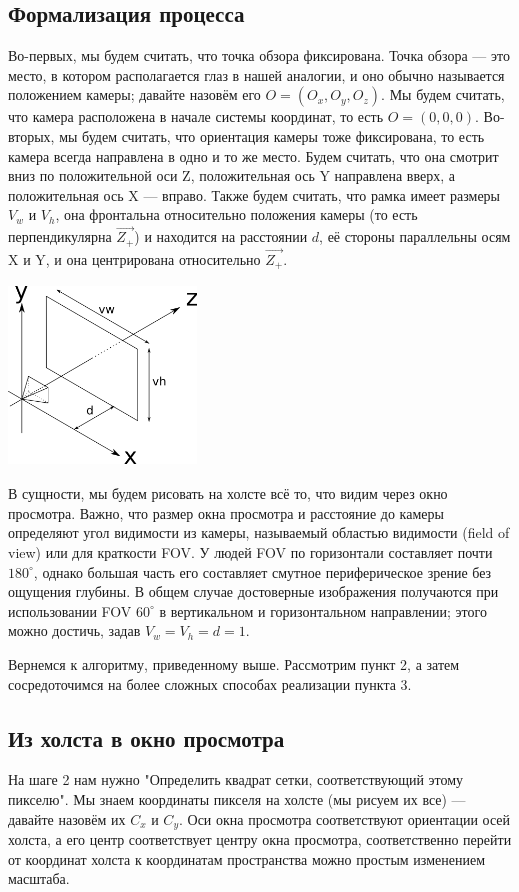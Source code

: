 \subsection{Формализация процесса}\label{1}
Во-первых, мы будем считать, что точка обзора фиксирована. Точка обзора — это место, в котором располагается глаз в нашей аналогии, и оно обычно называется положением камеры; давайте назовём его $O = (O_x, O_y, O_z)$. Мы будем считать, что камера расположена в начале системы координат, то есть $O = (0, 0, 0)$.
Во-вторых, мы будем считать, что ориентация камеры тоже фиксирована, то есть камера всегда направлена в одно и то же место. Будем считать, что она смотрит вниз по положительной оси Z, положительная ось Y направлена вверх, а положительная ось X — вправо.
Также будем считать, что рамка имеет размеры $V_w$ и $V_h$, она фронтальна относительно положения камеры (то есть перпендикулярна $\vec{Z_+}$) и находится на расстоянии $d$, её стороны параллельны осям X и Y, и она центрирована относительно $\vec{Z_+}$.

\includegraphics[width=5cm, height=4.8cm]{camera.png}

В сущности, мы будем рисовать на холсте всё то, что видим через окно просмотра. Важно, что размер окна просмотра и расстояние до камеры определяют угол видимости из камеры, называемый областью видимости (field of view) или для краткости FOV. У людей FOV по горизонтали составляет почти $180^\circ$, однако большая часть его составляет смутное периферическое зрение без ощущения глубины. В общем случае достоверные изображения получаются при использовании FOV $60^\circ$ в вертикальном и горизонтальном направлении; этого можно достичь, задав $V_w = V_h = d = 1$.

Вернемся к алгоритму, приведенному выше. Рассмотрим пункт 2, а затем сосредоточимся на более сложных способах реализации пункта 3.

\subsection{Из холста в окно просмотра}\label{1}
На шаге 2 нам нужно "Определить квадрат сетки, соответствующий этому пикселю". Мы знаем координаты пикселя на холсте (мы рисуем их все) — давайте назовём их $C_x$ и $C_y$. Оси окна просмотра соответствуют ориентации осей холста, а его центр соответствует центру окна просмотра, соответственно перейти от координат холста к координатам пространства можно простым изменением масштаба.

